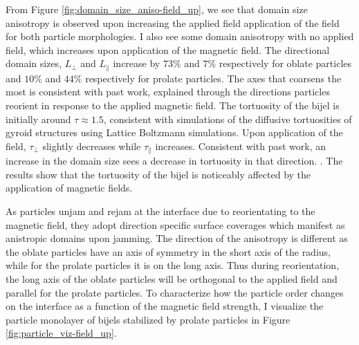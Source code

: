 From Figure \ref{fig:domain_size_aniso-field_up}, we see that domain
size anisotropy is observed upon increasing the applied field
application of the field for both particle morphologies. I also see
some domain anisotropy with no applied field, which increases upon
application of the magnetic field. The directional domain sizes,
$L_{\perp}$ and $L_{\parallel}$ increase by $73\%$ and $7\%$
respectively for oblate particles and $10\%$ and $44\%$ respectively
for prolate particles. The axes that coarsens the most is consistent
with past work, explained through the directions particles reorient in
response to the applied magnetic field. The
tortuosity of the bijel is initially around $\tau \approx 1.5$,
consistent with simulations of the diffusive tortuosities of gyroid
structures using Lattice Boltzmann simulations.
\cite{luo_macroscopic_2020} Upon application of the field,
$\tau_{\perp}$ slightly decreases while $\tau_{\parallel}$
increases. Consistent with past work, an increase in the domain size sees a decrease in
tortuosity in that direction. \cite{karthikeyan_formation_2024}. The results show that the
tortuosity of the bijel is noticeably affected by the application of
magnetic fields.

As particles unjam and rejam at the interface due to reorientating to
the magnetic field, they adopt direction specific surface coverages
which manifest as anistropic domains upon jamming. The direction of the
anisotropy is different as the oblate particles have an axis of symmetry
in the short axis of the radius, while for the prolate particles it is
on the long axis. Thus during reorientation, the long axis of the oblate
particles will be orthogonal to the applied field and parallel for the
prolate particles. To characterize how the particle order changes on the
interface as a function of the magnetic field strength, I visualize the
particle monolayer of bijels stabilized by prolate particles in Figure
\ref{fig:particle_viz-field_up}.

